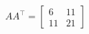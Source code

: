 \documentclass[preview]{standalone}
\begin{document}
\begin{align*}
AA^\top=\left[\begin{matrix}6&11\\11&21\end{matrix}\right]
\end{align*}
\end{document}
